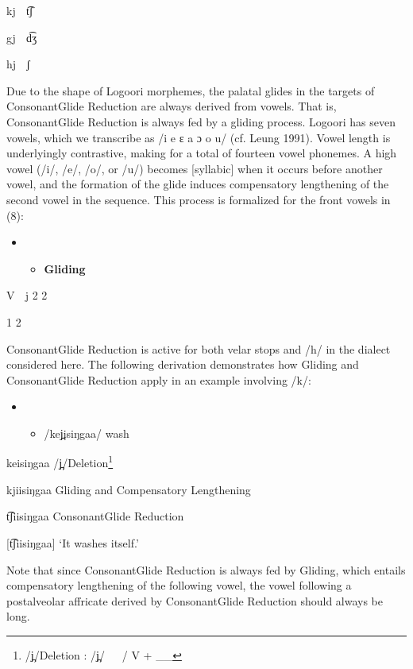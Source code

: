 \documentclass[output=paper]{langsci/langscibook}
\begin{document}
kj  t͡ʃ

gj  d͡ʒ

hj  ʃ

Due to the shape of Logoori morphemes, the palatal glides in the targets of ConsonantGlide Reduction are always derived from vowels. That is, ConsonantGlide Reduction is always fed by a gliding process. Logoori has seven vowels, which we transcribe as /i e ɛ a ɔ o u/ (cf. Leung 1991). Vowel length is underlyingly contrastive, making for a total of fourteen vowel phonemes. A high vowel (/i/, /e/, /o/, or /u/) becomes [syllabic] when it occurs before another vowel, and the formation of the glide induces compensatory lengthening of the second vowel in the sequence. This process is formalized for the front vowels in (8):

\begin{itemize}
\item \setcounter{itemize}{0}
\begin{itemize}
\item \textbf{Gliding}

\end{itemize}
\end{itemize}

V  j 2 2

 1    2

ConsonantGlide Reduction is active for both velar stops and /h/ in the dialect considered here. The following derivation demonstrates how Gliding and ConsonantGlide Reduction apply in an example involving /k/:

\begin{itemize}
\item \setcounter{itemize}{0}
\begin{itemize}
\item /kej̪isiŋgaa/  wash\textsc{ }

\end{itemize}
\end{itemize}

keisiŋgaa    /j̪/Deletion\footnote{   /j̪/Deletion \citep[116]{Leung1991}: /j̪/   / V + \_\_ }

kjiisiŋgaa    Gliding and Compensatory Lengthening

t͡ʃiisiŋgaa    ConsonantGlide Reduction

[t͡ʃiisiŋgaa]  ‘It washes itself.’

Note that since ConsonantGlide Reduction is always fed by Gliding, which entails compensatory lengthening of the following vowel, the vowel following a postalveolar affricate derived by ConsonantGlide Reduction should always be long.
\end{document}
